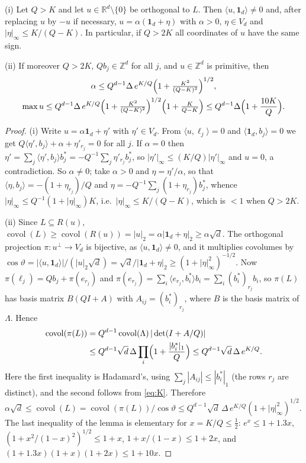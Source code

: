 \documentclass[12pt]{article}
\newcommand{\Z}{\mathbb{Z}}
\newcommand{\R}{\mathbb{R}}
\newcommand{\covol}{\operatorname{covol}}
\newcommand{\one}{\mathbf{1}}
\newcommand{\Lat}{\Lambda}
\begin{document}
\begin{lemma}\label{lem:shape}
\textup{(i)} Let $Q>K$ and let $u\in\R^d\setminus\{0\}$ be orthogonal to $L$. Then $\langle u,\one_d\rangle\ne0$ and,
after replacing $u$ by $-u$ if necessary, $u=\alpha(\one_d+\eta)$ with $\alpha>0$, $\eta\in V_d$ and
$|\eta|_\infty\le K/(Q-K)$. In particular, if $Q>2K$ all coordinates of $u$ have the same sign.

\textup{(ii)} If moreover $Q>2K$, $Qb_j\in\Z^d$ for all $j$, and $u\in\Z^d$ is primitive, then
\begin{gather*}
\alpha\le Q^{d-1}\Delta\,e^{K/Q}\Bigl(1+\tfrac{K^2}{(Q-K)^2}\Bigr)^{1/2},\\
\max u\le Q^{d-1}\Delta\,e^{K/Q}\Bigl(1+\tfrac{K^2}{(Q-K)^2}\Bigr)^{1/2}\Bigl(1+\tfrac{K}{Q-K}\Bigr)
\le Q^{d-1}\Delta\Bigl(1+\frac{10K}{Q}\Bigr).
\end{gather*}
\end{lemma}
\begin{proof}
(i) Write $u=\alpha\one_d+\eta'$ with $\eta'\in V_d$. From $\langle u,\ell_j\rangle=0$ and $\langle\one_d,b_j\rangle=0$
we get $Q\langle\eta',b_j\rangle+\alpha+\eta'_{r_j}=0$ for all $j$. If $\alpha=0$ then
$\eta'=\sum_j\langle\eta',b_j\rangle b_j^*=-Q^{-1}\sum_j\eta'_{r_j}b_j^*$, so $|\eta'|_\infty\le(K/Q)|\eta'|_\infty$ and
$u=0$, a contradiction. So $\alpha\ne0$; take $\alpha>0$ and $\eta=\eta'/\alpha$, so that
$\langle\eta,b_j\rangle=-(1+\eta_{r_j})/Q$ and $\eta=-Q^{-1}\sum_j(1+\eta_{r_j})b_j^*$, whence
$|\eta|_\infty\le Q^{-1}(1+|\eta|_\infty)K$, i.e.\ $|\eta|_\infty\le K/(Q-K)$, which is $<1$ when $Q>2K$.

(ii) Since $L\subseteq R(u)$, $\covol(L)\ge\covol(R(u))=|u|_2=\alpha|\one_d+\eta|_2\ge\alpha\sqrt d$.
The orthogonal projection $\pi\colon u^\perp\to V_d$ is bijective, as $\langle u,\one_d\rangle\ne0$, and it multiplies
covolumes by $\cos\vartheta=|\langle u,\one_d\rangle|/(|u|_2\sqrt d)=\sqrt d/|\one_d+\eta|_2\ge(1+|\eta|_\infty^2)^{-1/2}$.
Now $\pi(\ell_j)=Qb_j+\pi(e_{r_j})$ and $\pi(e_{r_j})=\sum_i\langle e_{r_j},b_i^*\rangle b_i=\sum_i(b_i^*)_{r_j}b_i$, so
$\pi(L)$ has basis matrix $B(QI+A)$ with $A_{ij}=(b_i^*)_{r_j}$, where $B$ is the basis matrix of $\Lat$. Hence
\begin{align*}
\covol(\pi(L))&=Q^{d-1}\covol(\Lat)\,|\det(I+A/Q)|\\
&\le Q^{d-1}\sqrt d\,\Delta\prod_i\Bigl(1+\frac{|b_i^*|_1}{Q}\Bigr)\le Q^{d-1}\sqrt d\,\Delta\,e^{K/Q} .
\end{align*}
Here the first inequality is Hadamard's, using $\sum_j|A_{ij}|\le|b_i^*|_1$ (the rows $r_j$ are distinct), and the
second follows from \eqref{eq:K}. Therefore $\alpha\sqrt d\le\covol(L)=\covol(\pi(L))/\cos\vartheta\le Q^{d-1}\sqrt d\,\Delta\,e^{K/Q}(1+|\eta|_\infty^2)^{1/2}$.
The last inequality of the lemma is elementary for $x=K/Q\le\frac12$: $e^x\le1+1.3x$,
$(1+x^2/(1-x)^2)^{1/2}\le1+x$, $1+x/(1-x)\le1+2x$, and $(1+1.3x)(1+x)(1+2x)\le1+10x$.
\end{proof}
\end{document}
